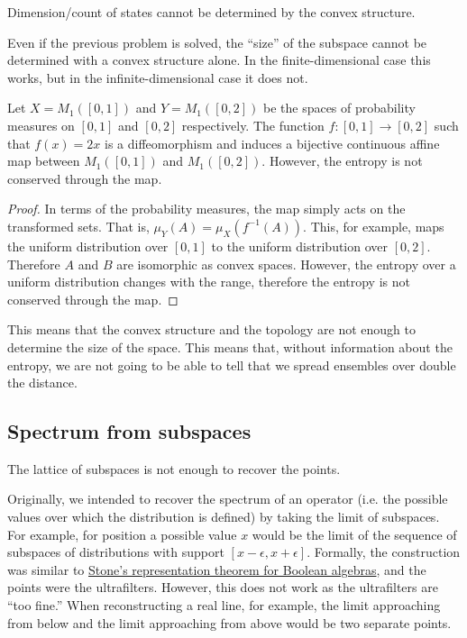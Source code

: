 \begin{insight}
	Dimension/count of states cannot be determined by the convex structure.
\end{insight}

Even if the previous problem is solved, the ``size'' of the subspace cannot be determined with a convex structure alone. In the finite-dimensional case this works, but in the infinite-dimensional case it does not.

\begin{prop}
	Let $X=M_1([0,1])$ and $Y=M_1([0,2])$ be the spaces of probability measures on $[0,1]$ and $[0,2]$ respectively. The function $f : [0,1] \to [0,2]$ such that $f(x) = 2x$ is a diffeomorphism and induces a bijective continuous affine map between $M_1([0,1])$ and $M_1([0,2])$. However, the entropy is not conserved through the map.
\end{prop}

\begin{proof}
	In terms of the probability measures, the map simply acts on the transformed sets. That is, $\mu_Y(A) = \mu_X(f^{-1}(A))$. This, for example, maps the uniform distribution over $[0,1]$ to the uniform distribution over $[0,2]$. Therefore $A$ and $B$ are isomorphic as convex spaces. However, the entropy over a uniform distribution changes with the range, therefore the entropy is not conserved through the map.
\end{proof}

This means that the convex structure and the topology are not enough to determine the size of the space. This means that, without information about the entropy, we are not going to be able to tell that we spread ensembles over double the distance.


\subsection{Spectrum from subspaces}

\begin{insight}
	The lattice of subspaces is not enough to recover the points.
\end{insight}

Originally, we intended to recover the spectrum of an operator (i.e. the possible values over which the distribution is defined) by taking the limit of subspaces. For example, for position a possible value $x$ would be the limit of the sequence of subspaces of distributions with support $[x-\epsilon, x+\epsilon]$. Formally, the construction was similar to \href{https://en.wikipedia.org/wiki/Stone%27s_representation_theorem_for_Boolean_algebras}{Stone's representation theorem for Boolean algebras}, and the points were the ultrafilters. However, this does not work as the ultrafilters are ``too fine.'' When reconstructing a real line, for example, the limit approaching from below and the limit approaching from above would be two separate points.

